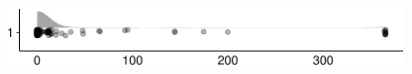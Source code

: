 \documentclass[
]{article}
\begin{document}
\begin{minipage}[t]{0.3\linewidth}

~

\end{minipage}%
\begin{minipage}[t]{0.7\linewidth}

\includegraphics[width=396px]{codebook_template_files/figure-latex/q7_31_rainplot-1}

\end{minipage}
 \vspace*{-5mm} 

\begin{minipage}[t]{0.3\linewidth}

~

\end{minipage}%
\begin{minipage}[t]{0.7\linewidth}

~

\end{minipage}
 \vspace*{-7mm} 
\end{document}
